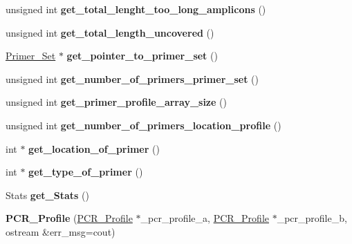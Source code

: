 \begin{DoxyCompactItemize}
unsigned int {\bfseries get\+\_\+total\+\_\+lenght\+\_\+too\+\_\+long\+\_\+amplicons} ()
\item 
\mbox{\label{class_p_c_r___profile_abcd1baf20c93c633b00b1fbd3e662b8f}} 
unsigned int {\bfseries get\+\_\+total\+\_\+length\+\_\+uncovered} ()
\item 
\mbox{\label{class_p_c_r___profile_a24577af6213a4f6ae4215d19836c5673}} 
\mbox{\hyperlink{class_primer___set}{Primer\+\_\+\+Set}} $\ast$ {\bfseries get\+\_\+pointer\+\_\+to\+\_\+primer\+\_\+set} ()
\item 
\mbox{\label{class_p_c_r___profile_a3adc7245807935d0d10c7600593254a2}} 
unsigned int {\bfseries get\+\_\+number\+\_\+of\+\_\+primers\+\_\+primer\+\_\+set} ()
\item 
\mbox{\label{class_p_c_r___profile_a43b9d518bca0cd7f37ce008fcfa1b37b}} 
unsigned int {\bfseries get\+\_\+primer\+\_\+profile\+\_\+array\+\_\+size} ()
\item 
\mbox{\label{class_p_c_r___profile_a7b3b84627171a22a57366adc1992ff3d}} 
unsigned int {\bfseries get\+\_\+number\+\_\+of\+\_\+primers\+\_\+location\+\_\+profile} ()
\item 
\mbox{\label{class_p_c_r___profile_a7f9b958200413a71f4edd93277da1765}} 
int $\ast$ {\bfseries get\+\_\+location\+\_\+of\+\_\+primer} ()
\item 
\mbox{\label{class_p_c_r___profile_a6243b3536533df498c781f9e592a86db}} 
int $\ast$ {\bfseries get\+\_\+type\+\_\+of\+\_\+primer} ()
\item 
\mbox{\label{class_p_c_r___profile_a05e64bbe69413cb969b31ffae46e6a10}} 
Stats {\bfseries get\+\_\+\+Stats} ()
\item 
\mbox{\label{class_p_c_r___profile_a3b52a78e4b4db8f2c571aaf66bf9a2cc}} 
{\bfseries P\+C\+R\+\_\+\+Profile} (\mbox{\hyperlink{class_p_c_r___profile}{P\+C\+R\+\_\+\+Profile}} $\ast$\+\_\+pcr\+\_\+profile\+\_\+a, \mbox{\hyperlink{class_p_c_r___profile}{P\+C\+R\+\_\+\+Profile}} $\ast$\+\_\+pcr\+\_\+profile\+\_\+b, ostream \&err\+\_\+msg=cout)

\end{DoxyCompactItemize}
